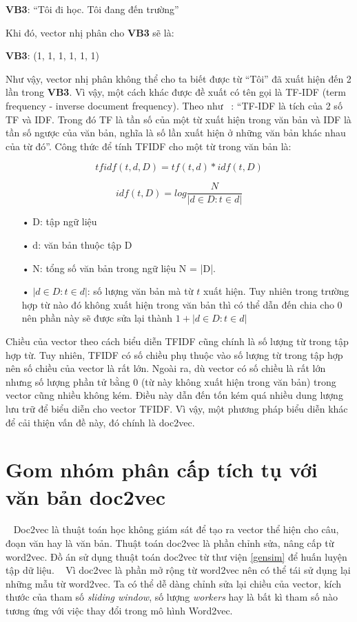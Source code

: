 \textbf{VB3}: ``Tôi đi học. Tôi đang đến trường''

Khi đó, vector nhị phân cho \textbf{VB3} sẽ là:

\textbf{VB3}: (1, 1, 1, 1, 1, 1)

Như vậy, vector nhị phân không thể cho ta biết được từ ``Tôi'' đã xuất hiện đến 2 lần trong \textbf{VB3}.
Vì vậy, một cách khác được đề xuất có tên gọi là TF-IDF (term frequency - inverse document frequency).
Theo như ~\cite{tf-idf}: ``TF-IDF là tích của 2 số TF và IDF. Trong đó TF là tần số của một từ xuất hiện trong văn bản và IDF là tần số ngược của văn bản, nghĩa là số lần xuất hiện ở những văn bản khác nhau của từ đó''.
Công thức để tính TFIDF cho một từ trong văn bản là:

\begin{equation}
tfidf (t, d, D) = tf(t, d) * idf (t, D)
\end{equation}

\begin{equation}
idf (t, D) = log \frac{N}{|{d \in D: t \in d}|}
\end{equation}

\begin{enumerate}
\item[•]D: tập ngữ liệu
\item[•]d: văn bản thuộc tập D
\item[•]N: tổng số văn bản trong ngữ liệu N = |D|.
\item[•]$|{d \in D: t \in d}|$: số lượng văn bản mà từ $t$ xuất hiện. Tuy nhiên trong trường hợp từ nào đó không xuất hiện trong văn bản thì có thể dẫn đến chia cho 0 nên phần này sẽ được sửa lại thành  $1 + |{d \in D: t \in d}|$
\end{enumerate}

Chiều của vector theo cách biểu diễn TFIDF cũng chính là số lượng từ trong tập hợp từ.
Tuy nhiên, TFIDF có số chiều phụ thuộc vào số lượng từ trong tập hợp nên số chiều của vector là rất lớn.
Ngoài ra, dù vector có số chiều là rất lớn nhưng số lượng phần tử bằng 0 (từ này không xuất hiện trong văn bản) trong vector cũng nhiều không kém.
Điều này dẫn đến tốn kém quá nhiều dung lượng lưu trữ để biểu diễn cho vector TFIDF.
Vì vậy, một phương pháp biểu diễn khác để cải thiện vấn đề này, đó chính là doc2vec.
%
%


\section{Gom nhóm phân cấp tích tụ với văn bản doc2vec}
~\cite{doc2vec-1} Doc2vec là thuật toán học không giám sát để tạo ra vector thể hiện cho câu, đoạn văn hay là văn bản.
Thuật toán doc2vec là phần chỉnh sửa, nâng cấp từ word2vec.
Đồ án sử dụng thuật toán doc2vec từ thư viện \ref{gensim} để huấn luyện tập dữ liệu.
~\cite{doc2vec-2} Vì doc2vec là phần mở rộng từ word2vec nên có thể tái sử dụng lại những mẫu từ word2vec. 
Ta có thể dễ dàng chỉnh sửa lại chiều của vector, kích thước của tham số \textit{sliding window}, số lượng \textit{workers} hay là bất kì tham số nào tương ứng với việc thay đổi trong mô hình Word2vec.

